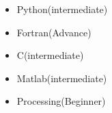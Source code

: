 
\begin{itemize}
    \item Python(intermediate)
    \item Fortran(Advance)
    \item C(intermediate)
    \item Matlab(intermediate)
    \item Processing(Beginner)
\end{itemize}
